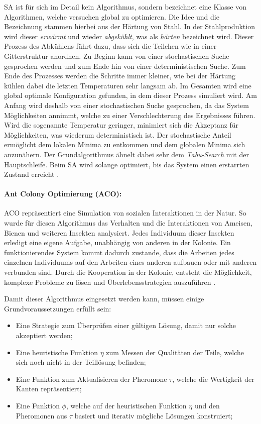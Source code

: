 SA ist für sich im Detail kein Algorithmus, sondern bezeichnet eine Klasse von Algorithmen, welche versuchen global zu optimieren. 
Die Idee und die Bezeichnung stammen hierbei aus der Härtung von Stahl. 
In der Stahlproduktion wird dieser \textit{erwärmt} und wieder \textit{abgekühlt}, was als \textit{härten} bezeichnet wird. 
Dieser Prozess des Abkühlens führt dazu, dass sich die Teilchen wie in einer Gitterstruktur anordnen. 
Zu Beginn kann von einer stochastischen Suche gesprochen werden und zum Ende hin von einer deterministischen Suche. 
Zum Ende des Prozesses werden die Schritte immer kleiner, wie bei der Härtung kühlen dabei die letzten Temperaturen sehr langsam ab. 
Im Gesamten wird eine global optimale Konfiguration gefunden, in dem dieser Prozess simuliert wird. 
Am Anfang wird deshalb von einer stochastischen Suche gesprochen, da das System Möglichkeiten annimmt, welche zu einer Verschlechterung des Ergebnisses führen. 
Wird die sogenannte Temperatur geringer, minimiert sich die Akzeptanz für Möglichkeiten, was wiederum deterministisch ist. 
Der stochastische Anteil ermöglicht dem lokalen Minima zu entkommen und dem globalen Minima sich anzunähern. 
Der Grundalgorithmus ähnelt dabei sehr dem \textit{Tabu-Search} mit der Hauptschleife. 
Beim SA wird solange optimiert, bis das System einen erstarrten Zustand erreicht \cite{kirkpatrick1983optimization}. 

\paragraph{Ant Colony Optimierung (ACO):}

ACO repräsentiert eine Simulation von sozialen Interaktionen in der Natur.
So wurde für diesen Algorithmus das Verhalten und die Interaktionen von Ameisen, Bienen und weiteren Insekten analysiert. 
Jedes Individuum dieser Insekten erledigt eine eigene Aufgabe, unabhängig von anderen in der Kolonie. 
Ein funktionierendes System kommt dadurch zustande, dass die Arbeiten jedes einzelnen Individuums auf den Arbeiten eines anderen aufbauen oder mit anderen verbunden sind.
Durch die Kooperation in der Kolonie, entsteht die Möglichkeit, komplexe Probleme zu lösen und Überlebensstrategien auszuführen \cite{mucherino2015ant, abraham2006swarm}. 

\noindent
Damit dieser Algorithmus eingesetzt werden kann, müssen einige Grundvoraussetzungen erfüllt sein:
\begin{itemize}
	\item Eine Strategie zum Überprüfen einer gültigen Lösung, damit nur solche akzeptiert werden;
	\item Eine heuristische Funktion $\eta$ zum Messen der Qualitäten der Teile, welche sich noch nicht in der Teillösung befinden;
	\item Eine Funktion zum Aktualisieren der Pheromone $\tau$, welche die Wertigkeit der Kanten repräsentiert; 
	\item Eine Funktion $\phi$, welche auf der heuristischen Funktion $\eta$ und den Pheromonen aus $\tau$ basiert und iterativ mögliche Lösungen konstruiert;  
\end{itemize}

